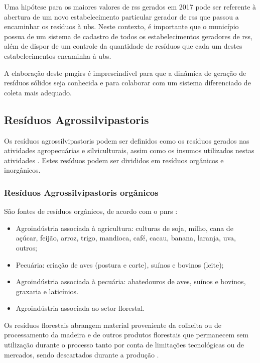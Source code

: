 	Uma hipótese para os maiores valores de \gls{rss} gerados em 2017 pode ser referente à abertura de um novo estabelecimento particular gerador de \gls{rss} que passou a encaminhar os resíduos à \gls{ubs}. Neste contexto, é importante que o município possua de um sistema de cadastro de todos os estabelecimentos geradores de \gls{rss}, além de dispor de um controle da quantidade de resíduos que cada um destes estabelecimentos encaminha à \gls{ubs}. 

	A elaboração deste \gls{pmgirs} é imprescindível para que a dinâmica de geração de resíduos sólidos seja conhecida e para colaborar com um sistema diferenciado de coleta mais adequado.

	
	\subsection{Resíduos Agrossilvipastoris}
	Os resíduos agrossilvipastoris podem ser definidos como os resíduos gerados nas atividades agropecuárias e silviculturais, assim como os insumos utilizados nestas atividades \cite{brasil:12305}. Estes resíduos podem ser divididos em resíduos orgânicos e inorgânicos.
	
	\subsubsection{Resíduos Agrossilvipastoris orgânicos}
	São fontes de resíduos orgânicos, de acordo com o \gls{pnrs} \cite{MMA2012}:
	
	\begin{itemize}
		\item Agroindústria associada à agricultura: culturas de soja, milho, cana de açúcar, feijão, arroz, trigo, mandioca, café, cacau, banana, laranja, uva, outros;
		\item Pecuária: criação de aves (postura e corte), suínos e bovinos (leite);
		\item Agroindústria associada à pecuária: abatedouros de aves, suínos e bovinos, graxaria e laticínios.
		\item Agroindústria associada ao setor florestal.
	\end{itemize}
	
	Os resíduos florestais abrangem material proveniente da colheita ou de processamento da madeira e de outros produtos florestais que permanecem sem utilização durante o processo tanto por conta de limitações tecnológicas ou de mercados, sendo descartados durante a produção \cite{Nolasco2000}. 
	
